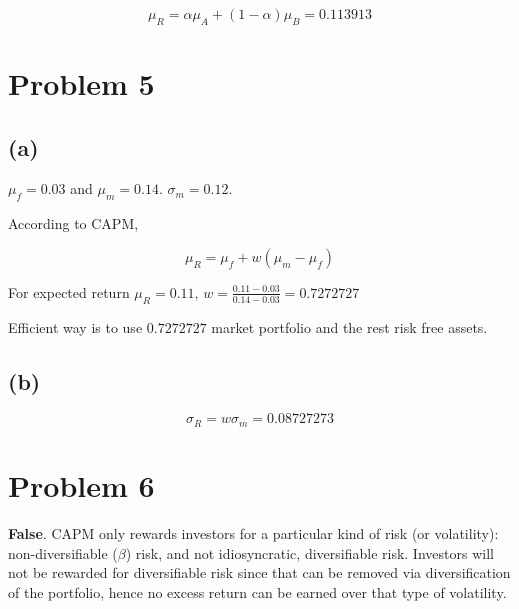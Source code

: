\documentclass[11pt]{scrartcl}
\begin{document}
\[\mu_R = \alpha \mu_A + (1-\alpha)\mu_B = 0.113913\]

\section*{Problem 5}

\subsection*{(a)}

$\mu_f = 0.03$ and $\mu_m = 0.14$. $\sigma_m = 0.12$. 

According to CAPM,

\[\mu_R = \mu_f + w(\mu_m - \mu_f)\]

For expected return $\mu_R = 0.11$, $w = \frac{0.11-0.03}{0.14-0.03} = 0.7272727$

Efficient way is to use $0.7272727$ market portfolio and the rest risk free assets.

\subsection*{(b)}

\[\sigma_R = w \sigma_m = 0.08727273\]

\section*{Problem 6}

\textbf{False}. CAPM only rewards investors for a particular kind of risk (or volatility): non-diversifiable ($\beta$) risk, and not idiosyncratic, diversifiable risk. Investors will not be rewarded for diversifiable risk since that can be removed via diversification of the portfolio, hence no excess return can be earned over that type of volatility.
\end{document}
